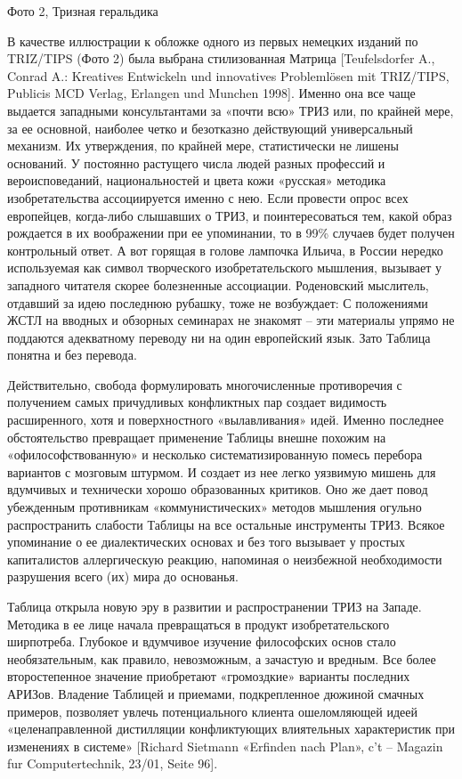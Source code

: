 \documentclass[11pt,a4paper]{article}
\begin{document}
Фото 2, Тризная геральдика

В качестве иллюстрации к обложке одного из первых немецких изданий по
TRIZ/TIPS (Фото 2) была выбрана стилизованная Матрица [Teufelsdorfer A.,
  Conrad A.: Kreatives Entwickeln und innovatives Problemlösen mit TRIZ/TIPS,
  Publicis MCD Verlag, Erlangen und Munchen 1998]. Именно она все чаще
выдается западными консультантами за «почти всю» ТРИЗ или, по крайней мере, за
ее основной, наиболее четко и безотказно действующий универсальный
механизм. Их утверждения, по крайней мере, статистически не лишены
оснований. У постоянно растущего числа людей разных профессий и
вероисповеданий, национальностей и цвета кожи «русская» методика
изобретательства ассоциируется именно с нею. Если провести опрос всех
европейцев, когда-либо слышавших о ТРИЗ, и поинтересоваться тем, какой образ
рождается в их воображении при ее упоминании, то в 99\% случаев будет получен
контрольный ответ. А вот горящая в голове лампочка Ильича, в России нередко
используемая как символ творческого изобретательского мышления, вызывает у
западного читателя скорее болезненные ассоциации. Роденовский мыслитель,
отдавший за идею последнюю рубашку, тоже не возбуждает: С положениями ЖСТЛ на
вводных и обзорных семинарах не знакомят -- эти материалы упрямо не поддаются
адекватному переводу ни на один европейский язык. Зато Таблица понятна и без
перевода.

Действительно, свобода формулировать многочисленные противоречия с получением
самых причудливых конфликтных пар создает видимость расширенного, хотя и
поверхностного «вылавливания» идей. Именно последнее обстоятельство превращает
применение Таблицы внешне похожим на «офилософствованную» и несколько
систематизированную помесь перебора вариантов с мозговым штурмом. И создает из
нее легко уязвимую мишень для вдумчивых и технически хорошо образованных
критиков. Оно же дает повод убежденным противникам «коммунистических» методов
мышления огульно распространить слабости Таблицы на все остальные инструменты
ТРИЗ. Всякое упоминание о ее диалектических основах и без того вызывает у
простых капиталистов аллергическую реакцию, напоминая о неизбежной
необходимости разрушения всего (их) мира до основанья.

Таблица открыла новую эру в развитии и распространении ТРИЗ на
Западе. Методика в ее лице начала превращаться в продукт изобретательского
ширпотреба. Глубокое и вдумчивое изучение философских основ стало
необязательным, как правило, невозможным, а зачастую и вредным. Все более
второстепенное значение приобретают «громоздкие» варианты последних
АРИЗов. Владение Таблицей и приемами, подкрепленное дюжиной смачных примеров,
позволяет увлечь потенциального клиента ошеломляющей идеей «целенаправленной
дистилляции конфликтующих влиятельных характеристик при изменениях в системе»
[Richard Sietmann «Erfinden nach Plan», c't -- Magazin fur Computertechnik,
  23/01, Seite 96].
\end{document}
